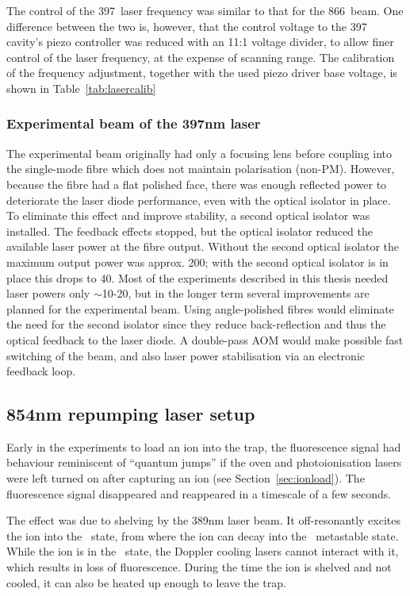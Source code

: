 The control of the 397\nm\, laser frequency was similar to that for the 866\nm\, beam. One difference between the two is, however, that the control voltage to the 397\nm\, cavity's piezo controller was reduced with an 11:1 voltage divider, to allow finer control of the laser frequency, at the expense of scanning range. The calibration of the frequency adjustment, together with the used piezo driver base voltage, is shown in Table~\ref{tab:lasercalib}


\subsubsection{Experimental beam of the 397nm laser}

The experimental beam originally had only a focusing lens before coupling into the single-mode fibre which does not maintain polarisation (non-PM). However, because the fibre had a flat polished face, there was enough reflected power to deteriorate the laser diode performance, even with the optical isolator in place.  To eliminate this effect and improve stability, a second optical isolator was installed. The feedback effects stopped, but the optical isolator reduced the available laser power at the fibre output. Without the second optical isolator the maximum output power was approx. 200\uW; with the second optical isolator is in place this drops to 40\uW. Most of the experiments described in this thesis needed laser powers only $\sim$10-20\uW, but in the longer term several improvements are planned for the experimental beam. Using angle-polished fibres would eliminate the need for the second isolator since they reduce back-reflection and thus the optical feedback to the laser diode. A double-pass AOM would make possible fast switching of the beam, and also laser power stabilisation via an electronic feedback loop. 

\subsection{854nm repumping laser setup}
\label{subsec:854setup}


Early in the experiments to load an ion into the trap, the fluorescence signal had behaviour reminiscent of ``quantum jumps'' if the oven and photoionisation lasers were left turned on after capturing an ion (see Section~\ref{sec:ionload}). The fluorescence signal disappeared and reappeared in a timescale of a few seconds. 

The effect was due to shelving by the 389nm laser beam. It off-resonantly excites the ion into the \pth\, state, from where the ion can decay into the \dfh\, metastable state. While the ion is in the \dfh\, state, the Doppler cooling lasers cannot interact with it, which results in loss of fluorescence. During the time the ion is shelved and not cooled, it can also be heated up enough to leave the trap. 

